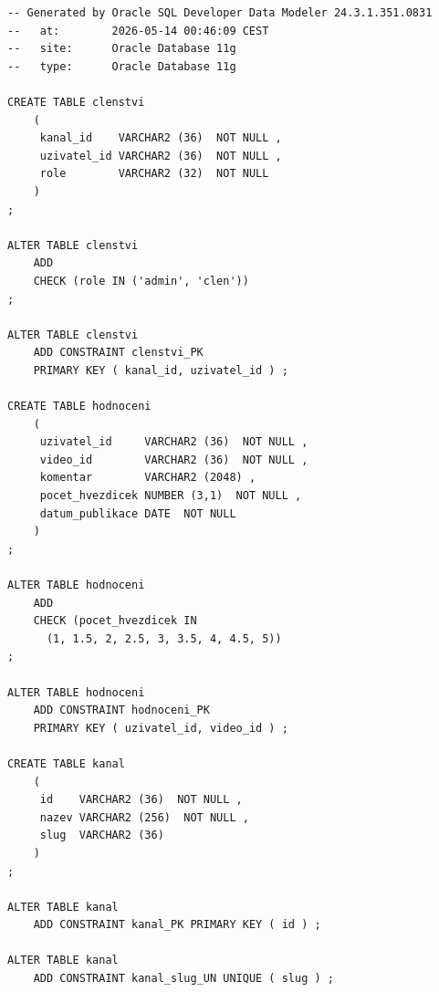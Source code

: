 \documentclass[12pt,a4paper]{article}
\begin{document}
\begin{lstlisting}
-- Generated by Oracle SQL Developer Data Modeler 24.3.1.351.0831
--   at:        2026-05-14 00:46:09 CEST
--   site:      Oracle Database 11g
--   type:      Oracle Database 11g

CREATE TABLE clenstvi
    (
     kanal_id    VARCHAR2 (36)  NOT NULL ,
     uzivatel_id VARCHAR2 (36)  NOT NULL ,
     role        VARCHAR2 (32)  NOT NULL
    )
;

ALTER TABLE clenstvi
    ADD
    CHECK (role IN ('admin', 'clen'))
;

ALTER TABLE clenstvi
    ADD CONSTRAINT clenstvi_PK
    PRIMARY KEY ( kanal_id, uzivatel_id ) ;

CREATE TABLE hodnoceni
    (
     uzivatel_id     VARCHAR2 (36)  NOT NULL ,
     video_id        VARCHAR2 (36)  NOT NULL ,
     komentar        VARCHAR2 (2048) ,
     pocet_hvezdicek NUMBER (3,1)  NOT NULL ,
     datum_publikace DATE  NOT NULL
    )
;

ALTER TABLE hodnoceni
    ADD
    CHECK (pocet_hvezdicek IN
      (1, 1.5, 2, 2.5, 3, 3.5, 4, 4.5, 5))
;

ALTER TABLE hodnoceni
    ADD CONSTRAINT hodnoceni_PK
    PRIMARY KEY ( uzivatel_id, video_id ) ;

CREATE TABLE kanal
    (
     id    VARCHAR2 (36)  NOT NULL ,
     nazev VARCHAR2 (256)  NOT NULL ,
     slug  VARCHAR2 (36)
    )
;

ALTER TABLE kanal
    ADD CONSTRAINT kanal_PK PRIMARY KEY ( id ) ;

ALTER TABLE kanal
    ADD CONSTRAINT kanal_slug_UN UNIQUE ( slug ) ;
\end{lstlisting}
\end{document}
